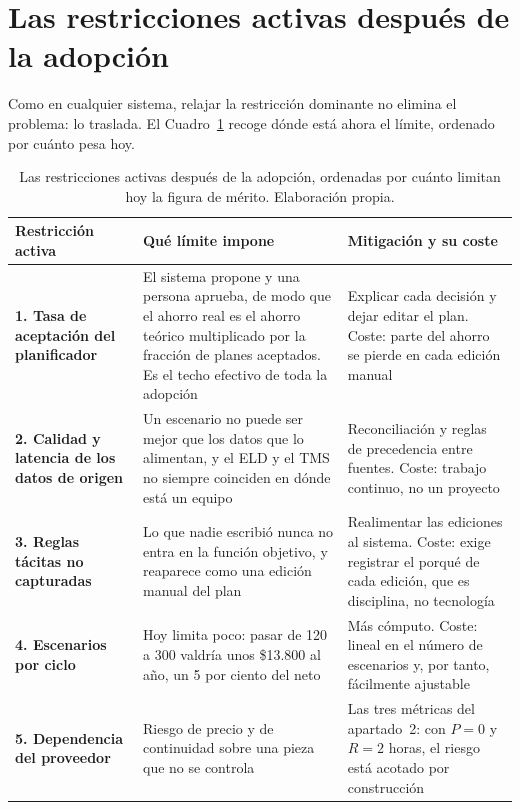 \documentclass[11pt,letterpaper]{article}
\begin{document}
\section{Las restricciones activas después de la adopción}

Como en cualquier sistema, relajar la restricción dominante no elimina el
problema: lo traslada. El Cuadro~\ref{cuadro:restricciones} recoge dónde está
ahora el límite, ordenado por cuánto pesa hoy.

\begin{table}[!htb]
\small
\caption{Las restricciones activas después de la adopción, ordenadas por
cuánto limitan hoy la figura de mérito. Elaboración propia.}
\label{cuadro:restricciones}
\begin{tabularx}{\textwidth}{@{}p{3.4cm}XX@{}}
\toprule
\textbf{Restricción activa} & \textbf{Qué límite impone} &
\textbf{Mitigación y su coste} \\
\midrule
\textbf{1. Tasa de aceptación del planificador}
& El sistema propone y una persona aprueba, de modo que el ahorro real es el
  ahorro teórico multiplicado por la fracción de planes aceptados. Es el techo
  efectivo de toda la adopción
& Explicar cada decisión y dejar editar el plan. Coste: parte del ahorro se
  pierde en cada edición manual \\
\addlinespace[2pt]
\textbf{2. Calidad y latencia de los datos de origen}
& Un escenario no puede ser mejor que los datos que lo alimentan, y el ELD y
  el TMS no siempre coinciden en dónde está un equipo
& Reconciliación y reglas de precedencia entre fuentes. Coste: trabajo
  continuo, no un proyecto \\
\addlinespace[2pt]
\textbf{3. Reglas tácitas no capturadas}
& Lo que nadie escribió nunca no entra en la función objetivo, y reaparece
  como una edición manual del plan
& Realimentar las ediciones al sistema. Coste: exige registrar el porqué de
  cada edición, que es disciplina, no tecnología \\
\addlinespace[2pt]
\textbf{4. Escenarios por ciclo}
& Hoy limita poco: pasar de 120 a 300 valdría unos \$13.800 al año, un 5 por
  ciento del neto
& Más cómputo. Coste: lineal en el número de escenarios y, por tanto,
  fácilmente ajustable \\
\addlinespace[2pt]
\textbf{5. Dependencia del proveedor}
& Riesgo de precio y de continuidad sobre una pieza que no se controla
& Las tres métricas del apartado~2: con $P = 0$ y $R = 2$ horas, el riesgo
  está acotado por construcción \\
\bottomrule
\end{tabularx}
\end{table}
\end{document}
